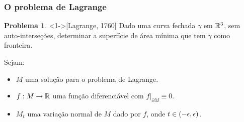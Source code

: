 \documentclass[10pt,a4paper]{beamer}
\theoremstyle{definition}
\newtheorem*{problema}{Problema}
\begin{document}
\begin{frame}
	\frametitle{O problema de Lagrange}
	
	\begin{problema}<1->[Lagrange, 1760]
		Dado uma curva fechada $\gamma$ em $\mathbb R^3$, sem auto-interseções, determinar a \alert{superfície de área mínima} que tem $\gamma$ como fronteira.
	\end{problema}
	
	\pause
	Sejam:
	\begin{itemize}
		\item $M$ uma solução para o problema de Lagrange.
		
		\pause
		
		\item $f: M \rightarrow \mathbb R$ uma função diferenciável com $f \vert_{\partial M} \equiv 0$.
		
		\pause
		
		\item $M_t$ uma variação normal de $M$ dado por $f$, onde $t \in \left( -\epsilon,\epsilon \right)$.
		
		
	\end{itemize}

	
	
	
\end{frame}
\end{document}
